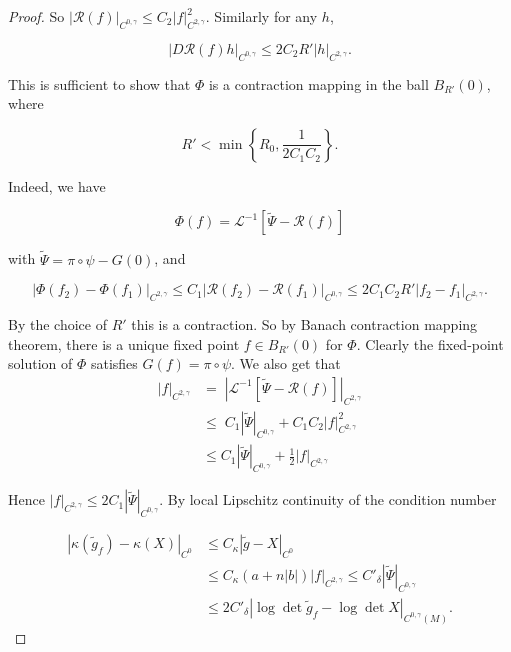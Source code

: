 \documentclass[11pt,letterpaper]{amsart}
\numberwithin{equation}{section}
\begin{document}
\begin{itemize}
\begin{proof}
So $|\mathcal R(f)|_{C^{0, \gamma}} \leq  C_2 |f|^2_{C^{2, \gamma}}.$ Similarly for any $h$,

$$ |D \mathcal R(f)h|_{C^{0, \gamma}} \leq 2 C_2 R' |h|_{C^{2, \gamma}}.$$


This is sufficient to show that $\Phi$ is a contraction mapping in the ball $B_{R'}(0)$, where 


$$R' < \min\left\{R_0, \frac{1}{2 C_{1}C_{2}} \right\}.$$

Indeed, we have 

$$\Phi(f) = \mathcal L^{-1}[\tilde{\Psi} -\mathcal{R}(f)]$$

\noindent \noindent with $\tilde{\Psi} = \pi\circ\psi - G(0)$, and 

$$|\Phi (f_2) - \Phi (f_1)|_{C^{2, \gamma}} \leq C_1 |\mathcal{R}(f_2) - \mathcal{R}(f_1)|_{C^{0, \gamma}} \leq 2C_1 C_2 R'|f_2 - f_1|_{C^{2, \gamma}}.$$

By the choice of $R'$ this is a contraction. So by Banach contraction mapping theorem, there is a unique fixed point $f \in B_{R'}(0)$ for $\Phi$. Clearly the fixed-point solution of $\Phi$ satisfies $G(f) = \pi\circ\psi$. We also get that
\begin{equation}
    \begin{aligned}
        |f|_{C^{2, \gamma}} &= \; |\mathcal{L}^{-1}[\tilde \Psi - \mathcal R(f)]|_{C^{2, \gamma}}\\
        & \leq \; C_1 |\tilde \Psi|_{C^{0, \gamma}} + C_1C_2 |f|^2_{C^{2, \gamma}}\\
        &\leq C_1 |\tilde \Psi|_{C^{0, \gamma}} + \frac{1}{2} |f|_{C^{2, \gamma}}
    \end{aligned}
\end{equation}


Hence $|f|_{C^{2, \gamma}} \leq 2C_1|\tilde \Psi|_{C^{0, \gamma}}$. By local Lipschitz continuity of the condition number

 \begin{equation}
     \begin{aligned}
         |\kappa(\tilde g_f) - \kappa(X)|_{C^{0}} &\leq C_{\kappa} |\tilde g - X|_{C^0} \\
         &\leq C_{\kappa}(a+n |b|) |f|_{C^{2, \gamma}} \leq C'_{\delta} |\tilde \Psi|_{C^{0, \gamma}}\\
         & \leq 2C'_{\delta} | \log \det \tilde g_f -  \log \det X|_{C^{0,\gamma}(M)}.
     \end{aligned}
 \end{equation}


\end{proof}
\end{itemize}
\end{document}
